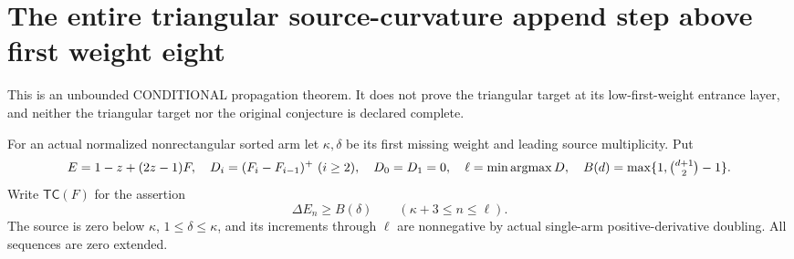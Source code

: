 \section{The entire triangular source-curvature append step above first weight eight}
This is an unbounded CONDITIONAL propagation theorem. It does not prove
the triangular target at its low-first-weight entrance layer, and neither
the triangular target nor the original conjecture is declared complete.

For an actual normalized nonrectangular sorted arm let $\kappa,\delta$
be its first missing weight and leading source multiplicity. Put
\[
 E=1-z+(2z-1)F,\quad D_i=(F_i-F_{i-1})^+\ (i\ge2),
 \quad D_0=D_1=0,\quad \ell=\min\operatorname{argmax}D,
 \quad B(d)=\max\{1,\tbinom{d+1}{2}-1\}.
\]
Write $\mathsf{TC}(F)$ for the assertion
\[
          \Delta E_n\ge B(\delta)
                     \qquad(\kappa+3\le n\le\ell).       \tag{TC}
\]
The source is zero below $\kappa$, $1\le\delta\le\kappa$, and
its increments through $\ell$ are nonnegative by actual single-arm
positive-derivative doubling. All sequences are zero extended.

